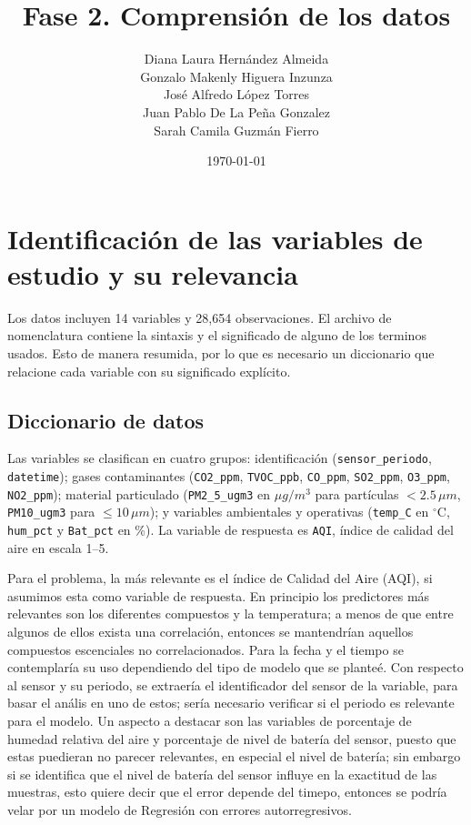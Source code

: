 \documentclass{article}
\title{Fase 2. Comprensión de los datos}
\author{
    Diana Laura Hernández Almeida \\
    Gonzalo Makenly Higuera Inzunza \\
    José Alfredo López Torres \\
    Juan Pablo De La Peña Gonzalez \\
    Sarah Camila Guzmán Fierro
}
\date{\today}
\begin{document}
\maketitle

\section*{Identificación de las variables de estudio y su relevancia}

Los datos incluyen 14 variables y 28,654 observaciones. El archivo de nomenclatura contiene la sintaxis y el significado de alguno 
de los terminos usados. Esto de manera resumida, por lo que es necesario un diccionario que relacione cada variable con su 
significado explícito. 

\subsection*{Diccionario de datos}
 
Las variables se clasifican en cuatro grupos: identificación (\texttt{sensor\_periodo}, \texttt{datetime}); gases contaminantes (\texttt{CO2\_ppm}, \texttt{TVOC\_ppb}, \texttt{CO\_ppm}, \texttt{SO2\_ppm}, \texttt{O3\_ppm}, \texttt{NO2\_ppm}); material particulado (\texttt{PM2\_5\_ugm3} en $\mu g/m^3$ para partículas $<2.5\,\mu m$, \texttt{PM10\_ugm3} para $\leq 10\,\mu m$); y variables ambientales y operativas (\texttt{temp\_C} en $^\circ$C, \texttt{hum\_pct} y \texttt{Bat\_pct} en \%). La variable de respuesta es \texttt{AQI}, índice de calidad del aire en escala 1--5.

Para el problema, la más relevante es el índice de Calidad del Aire (AQI), si asumimos esta como variable de respuesta. 
En principio los predictores más relevantes son los diferentes compuestos y la temperatura; a menos de que entre algunos 
de ellos exista una correlación, entonces se mantendrían aquellos compuestos escenciales no correlacionados. Para la fecha 
y el tiempo se contemplaría su uso dependiendo del tipo de modelo que se planteé. Con respecto al sensor y su periodo, se 
extraería el identificador del sensor de la variable, para basar el anális en uno de estos; sería necesario verificar si 
el periodo es relevante para el modelo. Un aspecto a destacar son las variables de porcentaje de humedad relativa del aire 
y porcentaje de nivel de batería del sensor, puesto que estas puedieran no parecer relevantes, en especial el nivel de batería; 
sin embargo si se identifica que el nivel de batería del sensor influye en la exactitud de las muestras, esto quiere decir que 
el error depende del timepo, entonces se podría velar por un modelo de Regresión con errores autorregresivos.
\end{document}
